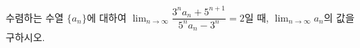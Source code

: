수렴하는 수열 $\{a_n\}$에 대하여 $\displaystyle\lim_{n\to\infty}\dfrac{3^na_n+5^{n+1}}{5^na_n-3^n}=2$일 때, $\displaystyle\lim_{n\to\infty}a_n$의 값을 구하시오.
